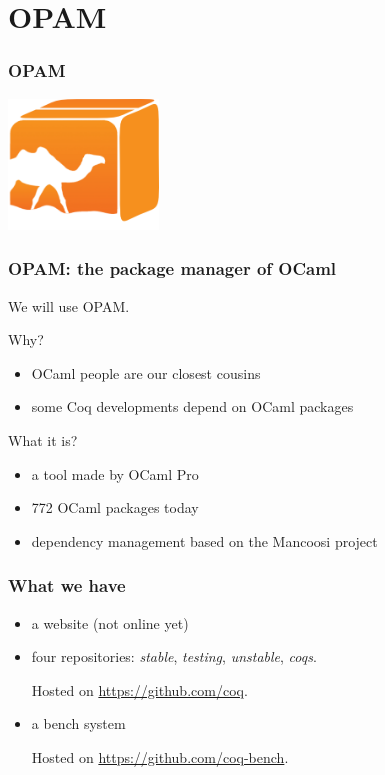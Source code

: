 \documentclass{beamer}
\begin{document}
  \section{OPAM}
  \begin{frame}
    \frametitle{OPAM}
    \begin{center}
      \includegraphics[width=4cm]{images/opam}
    \end{center}
  \end{frame}
  \begin{frame}
    \frametitle{OPAM: the package manager of OCaml}
    We will use OPAM.

    Why?
    \begin{itemize}
      \item OCaml people are our closest cousins
      \item some Coq developments depend on OCaml packages
    \end{itemize}
    What it is?
    \begin{itemize}
      \item a tool made by OCaml Pro
      \item 772 OCaml packages today
      \item dependency management based on the Mancoosi project
    \end{itemize}
  \end{frame}
  \begin{frame}
    \frametitle{What we have}
    \begin{itemize}
      \item a website (not online yet)
      \item four repositories: \emph{stable}, \emph{testing}, \emph{unstable}, \emph{coqs}.

        Hosted on \url{https://github.com/coq}.
      \item a bench system

        Hosted on \url{https://github.com/coq-bench}.
    \end{itemize}
  \end{frame}
\end{document}
